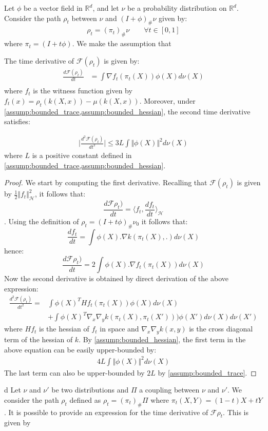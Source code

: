 	Let $\phi$ be a vector field in $\mathbb{R}^d$, and let $\nu$  be a probability distribution on $\mathbb{R}^d$. Consider the path $\rho_t$ between $\nu$ and $(I+\phi)_{\#}\nu$ given by:
	\begin{align*}
		\rho_t=  (\pi_t)_{\#}\nu \qquad \forall t\in [0,1]
	\end{align*}
	where $\pi_t = (I+t\phi)$. We make the assumption that 



\begin{lemma}\label{lem:derivative_mmd}
 The time derivative of $\mathcal{F}(\rho_t)$ is given by:
	\begin{align*}
		\frac{d \mathcal{F}(\rho_t)}{dt}&=\int \nabla f_t(\pi_t(X)) \phi(X)d\nu(X)\\
	\end{align*}
where $f_t$ is the witness function given by $f_t(x)=  \rho_t( k(X,x) )-\mu( k(X,x) )$.	
	Moreover, under \cref{assump:bounded_trace,assump:bounded_hessian}, the second time derivative satisfies:
	
	\begin{align*}
		\vert \frac{d^2 \mathcal{F}(\rho_t)}{dt^2} \vert \leq 3L \int \Vert \phi(X) \Vert^2 d\nu(X)
	\end{align*}
	where $L$ is a positive constant defined in \cref{assump:bounded_trace,assump:bounded_hessian}.
	
\end{lemma}
\begin{proof}
We start by computing the first derivative. Recalling that $\mathcal{F}(\rho_t)$ is given by $\frac{1}{2}\Vert f_t\Vert^2_{\mathcal{H}} $, it follows that:
\[
\frac{d\mathcal{F}\rho_{t})}{dt}=\langle f_{t},\frac{df_{t}}{dt}\rangle_{\mathcal{H}}
\]. Using the definition
of $\rho_{t}=(I+t\phi)_{\#}\nu_0$ it follows that:
\[
\frac{df_{t}}{dt}=\int \phi(X).\nabla k(\pi_{t}(X),.)d\nu(X)
\]
hence:
\[
\frac{d\mathcal{F}\rho_{t})}{dt}=2\int\phi(X).\nabla f_{t}(\pi_{t}(X))d\nu(X)
\]
Now the second derivative is obtained by direct derivation of the above expression:
	\begin{align*}
		\frac{d^2 \mathcal{F}(\rho_t)}{dt^2} =& \int \phi(X)^THf_t(\pi_t(X))\phi(X)d\nu(X)\\ 
		&+\int \phi(X)^T\nabla_x\nabla_y k(\pi_t(X),\pi_t(X')) ) \phi(X')d\nu(X)d\nu(X') 
	\end{align*}
where $Hf_t$ is the hessian of $f_t$ in space and  $\nabla_x\nabla_y k(x,y)$ is the cross diagonal term of the hessian of $k$. By \ref{assump:bounded_hessian}, the first term in the above equation can be easily upper-bounded by:
\begin{align*}
	4L \int \Vert \phi(X)\Vert^2d\nu(X)  
\end{align*}
The last term can also be upper-bounded by $2L$ by \ref{assump:bounded_trace}.

\end{proof}
 d
Let $  \nu$ and $\nu'$ be two distributions and $\Pi$ a coupling between $\nu$ and $\nu'$. We consider the path $\rho_t$ defined as $\rho_t=(\pi_t)_{\#}\Pi$ where $\pi_t(X,Y)=(1-t)X+tY$. It is possible to provide an expression for the time derivative of $\mathcal{F}{\rho_t}$. This is given by 

